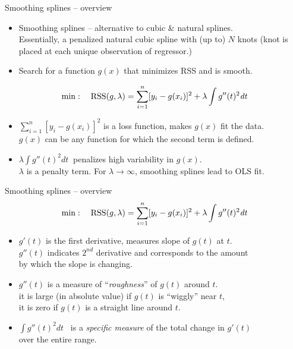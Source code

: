 \documentclass{beamer}
\begin{document}
\begin{frame}{Smoothing splines -- overview}
\begin{itemize}
    \item Smoothing splines -- alternative to cubic \& natural splines. \\Essentially, a penalized natural cubic spline with (up to) $N$ knots (knot is placed at each unique observation of regressor.)
    \bigskip
    \item Search for a function $g(x)$ that minimizes RSS and is smooth.
\end{itemize} \medskip
$$\min:~~~\textnormal{RSS}(g,\lambda) = \sum_{i=1}^n [y_i - g(x_i)]^2 + \lambda \int g''(t)^2 \textit{dt}$$
\begin{itemize}
    \item $\sum_{i=1}^n [y_i - g(x_i)]^2$ is a loss function, makes $g(x)$ fit the data.\\  \smallskip
    $g(x)$ can be any function for which the second term is defined.\\
    \bigskip
    \item $\lambda \int \! g''(t)^2 \textit{dt}~$ penalizes high variability in $g(x)$.\\  \smallskip
    $\lambda$ is a penalty term. For $\lambda \rightarrow \infty$, smoothing splines lead to OLS fit.
\end{itemize}
\end{frame}
\begin{frame}{Smoothing splines -- overview}
$$\min:~~~\textnormal{RSS}(g,\lambda) = \sum_{i=1}^n [y_i - g(x_i)]^2 + \lambda \int g''(t)^2 \textit{dt}$$
\begin{itemize}
    \item $g'(t)$ is the first derivative, measures slope of $g(t)$ at $t$.\\
    \smallskip
    $g''(t)$ indicates $2^{nd}$ derivative and corresponds to the amount \\by which the slope is changing.
    \medskip
    \item $g''(t)$ is a measure of ``\textit{roughness}'' of $g(t)$ around $t$.\\
    \smallskip
    it is large (in absolute value) if $g(t)$ is ``wiggly'' near $t$,\\
    \smallskip
    it is zero if $g(t)$ is a straight line around $t$.
    \medskip
    \item $\int g''(t)^2 \textit{dt}$ ~is a \textit{specific measure} of the total change in $g'(t)$ \\over the entire range. 
\end{itemize}
\end{frame}
\end{document}
